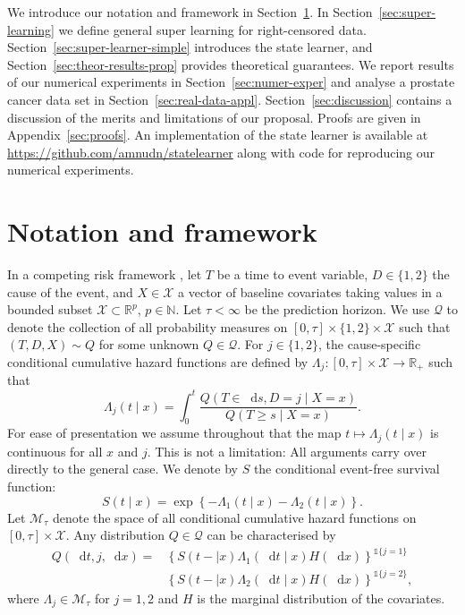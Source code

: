 \documentclass[a4paper,danish]{article}
\theoremstyle{plain} %
\numberwithin{theorem}{section}
\theoremstyle{definition} %
\theoremstyle{remark}
\newcommand{\R}{\mathbb{R}}
\newcommand{\N}{\mathbb{N}}
\newcommand*\diff{\mathop{}\!\mathrm{d}}
\newcommand{\1}{\mathds{1}}
\begin{document}
We introduce our notation and framework in
Section~\ref{sec:framework}. In
Section~\ref{sec:super-learning} we define general super
learning for right-censored data.
Section~\ref{sec:super-learner-simple} introduces the state
learner, and Section~\ref{sec:theor-results-prop} provides
theoretical guarantees. We report results of our numerical
experiments in Section~\ref{sec:numer-exper} and analyse a
prostate cancer data set in Section~\ref{sec:real-data-appl}.
Section~\ref{sec:discussion} contains a discussion of the
merits and limitations of our proposal. Proofs are given in
Appendix~\ref{sec:proofs}. An implementation of the state
learner is available at
\url{https://github.com/amnudn/statelearner} along with code
for reproducing our numerical experiments.

\section{Notation and framework}
\label{sec:framework}

In a competing risk framework \citep{andersen2012statistical}, let
\( T\) be a time to event variable, \(D\in\{1,2\}\) the cause of the
event, and $X \in \mathcal{X}$ a vector of baseline covariates taking
values in a bounded subset \( \mathcal{X} \subset \R^p \),
\( p\in\N \). Let $\tau< \infty$ be the prediction horizon. We use
\( \mathcal{Q} \) to denote the collection of all probability measures
on \( [0,\tau] \times \{1,2\}\times \mathcal{X} \) such that
\( (T, D, X) \sim Q \) for some unknown \( Q \in \mathcal{Q} \). For
\(j\in\{1,2\}\), the cause-specific conditional cumulative hazard
functions are defined by
\( \Lambda_{j} \colon [0, \tau] \times \mathcal{X} \rightarrow \R_+ \)
such that
\begin{equation*}
  \Lambda_{j}(t \mid x) = \int_0^t\frac{  Q(T \in \diff s, D=j \mid X=x )}{Q(T \geq s \mid X=x )}.
\end{equation*}
For ease of presentation we assume throughout that the map
\( t\mapsto \Lambda_j(t \mid x) \) is continuous for all \( x \) and
\( j \). This is not a limitation: All arguments carry over directly
to the general case. We denote by \(S\) the conditional event-free
survival function:
\begin{equation}
  \label{eq:surv-def}
  S(t \mid x)=\exp\left\{-\Lambda_{1}(t \mid x)-\Lambda_{2}(t \mid x)\right\}.
\end{equation}
Let \( \mathcal{M}_{\tau}\) denote the space of all conditional cumulative hazard
functions on \( [0,\tau] \times\mathcal{X}\). Any distribution
\( Q \in \mathcal{Q} \) can be characterised by
\begin{equation*}
  \label{eq:parametrizeQ}
  \begin{split}
    Q(\diff t,j,\diff x)=& \left\{S(t- \mid x)\Lambda_1(\diff t \mid x)H(\diff x)\right\}^{\1{\{j=1\}}}\\
                         &  \left\{S(t- \mid x)\Lambda_2(\diff t \mid x)H(\diff x)\right\}^{\1{\{j=2\}}},
  \end{split}
\end{equation*}
where \(\Lambda_{j} \in \mathcal{M}_{\tau}\) for \(j=1,2\) and \(H\) is the marginal
distribution of the covariates.
\end{document}
